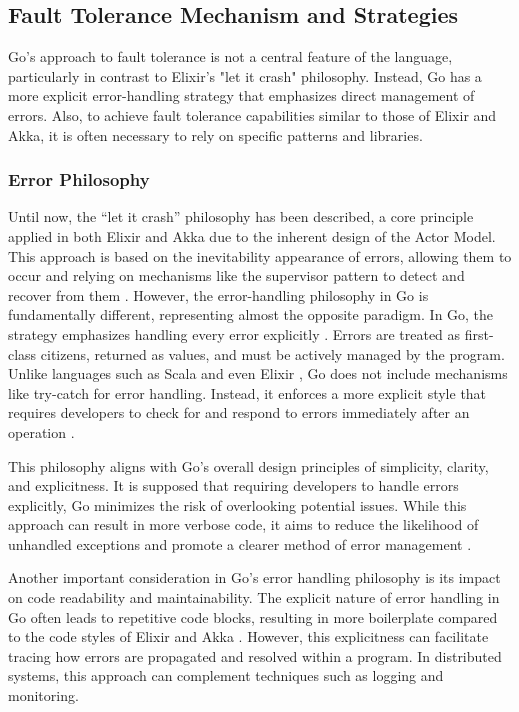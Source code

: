 \subsection{Fault Tolerance Mechanism and Strategies}

Go's approach to fault tolerance is not a central feature of the language, particularly in contrast to Elixir's "let it crash" philosophy. Instead, Go has a more explicit error-handling strategy that emphasizes direct management of errors. Also, to achieve fault tolerance capabilities similar to those of Elixir and Akka, it is often necessary to rely on specific patterns and libraries.

\subsubsection{Error Philosophy}

Until now, the “let it crash” philosophy has been described, a core principle applied in both Elixir and Akka due to the inherent design of the Actor Model. This approach is based on the inevitability appearance of errors, allowing them to occur and relying on mechanisms like the supervisor pattern to detect and recover from them \cite{Armstrong2013}. However, the error-handling philosophy in Go is fundamentally different, representing almost the opposite paradigm. In Go, the strategy emphasizes handling every error explicitly \cite{Kennedy2016,go-docs}. Errors are treated as first-class citizens, returned as values, and must be actively managed by the program. Unlike languages such as Scala and even Elixir \cite{elixir-docs-hexdocs}, Go does not include mechanisms like try-catch for error handling. Instead, it enforces a more explicit style that requires developers to check for and respond to errors immediately after an operation \cite{Cox-Buday2017}.

This philosophy aligns with Go’s overall design principles of simplicity, clarity, and explicitness. It is supposed that requiring developers to handle errors explicitly, Go minimizes the risk of overlooking potential issues. While this approach can result in more verbose code, it aims to reduce the likelihood of unhandled exceptions and promote a clearer method of error management \cite{Kennedy2016, go-docs}.

Another important consideration in Go’s error handling philosophy is its impact on code readability and maintainability. The explicit nature of error handling in Go often leads to repetitive code blocks, resulting in more boilerplate compared to the code styles of Elixir and Akka \cite{Kennedy2016, go-docs}. However, this explicitness can facilitate tracing how errors are propagated and resolved within a program. In distributed systems, this approach can complement techniques such as logging and monitoring.

